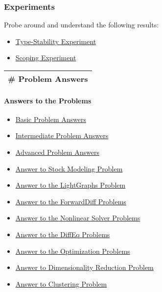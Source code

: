 \documentclass[11pt]{article}
\providecommand{\tightlist}{%
      \setlength{\itemsep}{0pt}\setlength{\parskip}{0pt}}
\begin{document}
\subsubsection{Experiments}\label{experiments}

Probe around and understand the following results:

\begin{itemize}
\tightlist
\item
  \href{http://ucidatascienceinitiative.github.io/IntroToJulia/Html/TypeStabilityExperiment}{Type-Stability
  Experiment}
\item
  \href{http://ucidatascienceinitiative.github.io/IntroToJulia/Html/ScopingExperiment}{Scoping
  Experiment}
\end{itemize}

    \begin{longtable}[]{@{}l@{}}
\toprule
\# Problem Answers\tabularnewline
\bottomrule
\end{longtable}

\paragraph{Answers to the Problems}\label{answers-to-the-problems}

\begin{itemize}
\tightlist
\item
  \href{http://ucidatascienceinitiative.github.io/IntroToJulia/Html/BasicProblemAnswers}{Basic
  Problem Answers}
\item
  \href{http://ucidatascienceinitiative.github.io/IntroToJulia/Html/IntermediateProblemAnswers}{Intermediate
  Problem Answers}
\item
  \href{http://ucidatascienceinitiative.github.io/IntroToJulia/Html/AdvancedProblemAnswers}{Advanced
  Problem Answers}
\item
  \href{http://ucidatascienceinitiative.github.io/IntroToJulia/Html/StockProblemAnswers}{Answer
  to Stock Modeling Problem}
\item
  \href{http://ucidatascienceinitiative.github.io/IntroToJulia/Html/LightGraphsAnswers}{Answer
  to the LightGraphs Problem}
\item
  \href{http://ucidatascienceinitiative.github.io/IntroToJulia/Html/ForwardDiffAnswers}{Answer
  to the ForwardDiff Problems}
\item
  \href{http://ucidatascienceinitiative.github.io/IntroToJulia/Html/NonlinearSolveAnswers}{Answer
  to the Nonlinear Solver Problems}
\item
  \href{http://ucidatascienceinitiative.github.io/IntroToJulia/Html/DiffEqSolutions}{Answer
  to the DiffEq Problems}
\item
  \href{http://ucidatascienceinitiative.github.io/IntroToJulia/Html/OptimizationAnswers}{Answer
  to the Optimization Problems}
\item
  \href{http://ucidatascienceinitiative.github.io/IntroToJulia/Html/DimensionalityReductionSolutions}{Answer
  to Dimensionality Reduction Problem}
\item
  \href{http://ucidatascienceinitiative.github.io/IntroToJulia/Html/ClusteringSolutions}{Answer
  to Clustering Problem}
\end{itemize}
\end{document}
